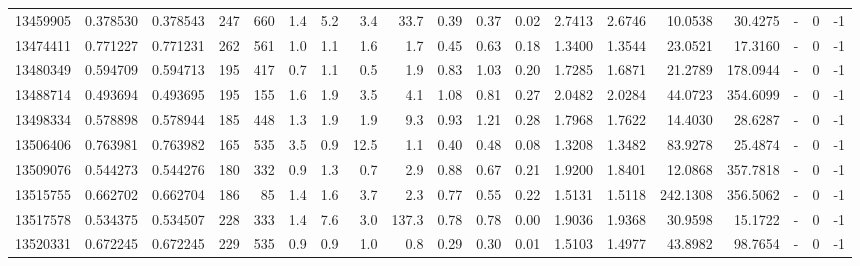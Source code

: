 \begin{tabular}{rrrrrrrrrrrrrrrrlrr}
  13459905 & 0.378530 &   0.378543 &  247 &  660 &      1.4 &      5.2 &     3.4 &     33.7 &       0.39 &        0.37 &        0.02 &  2.7413 &  2.6746 &   10.0538 &   30.4275 &             - &        0 &         -1 \\
  13474411 & 0.771227 &   0.771231 &  262 &  561 &      1.0 &      1.1 &     1.6 &      1.7 &       0.45 &        0.63 &        0.18 &  1.3400 &  1.3544 &   23.0521 &   17.3160 &             - &        0 &         -1 \\
  13480349 & 0.594709 &   0.594713 &  195 &  417 &      0.7 &      1.1 &     0.5 &      1.9 &       0.83 &        1.03 &        0.20 &  1.7285 &  1.6871 &   21.2789 &  178.0944 &             - &        0 &         -1 \\
  13488714 & 0.493694 &   0.493695 &  195 &  155 &      1.6 &      1.9 &     3.5 &      4.1 &       1.08 &        0.81 &        0.27 &  2.0482 &  2.0284 &   44.0723 &  354.6099 &             - &        0 &         -1 \\
  13498334 & 0.578898 &   0.578944 &  185 &  448 &      1.3 &      1.9 &     1.9 &      9.3 &       0.93 &        1.21 &        0.28 &  1.7968 &  1.7622 &   14.4030 &   28.6287 &             - &        0 &         -1 \\
  13506406 & 0.763981 &   0.763982 &  165 &  535 &      3.5 &      0.9 &    12.5 &      1.1 &       0.40 &        0.48 &        0.08 &  1.3208 &  1.3482 &   83.9278 &   25.4874 &             - &        0 &         -1 \\
  13509076 & 0.544273 &   0.544276 &  180 &  332 &      0.9 &      1.3 &     0.7 &      2.9 &       0.88 &        0.67 &        0.21 &  1.9200 &  1.8401 &   12.0868 &  357.7818 &             - &        0 &         -1 \\
  13515755 & 0.662702 &   0.662704 &  186 &   85 &      1.4 &      1.6 &     3.7 &      2.3 &       0.77 &        0.55 &        0.22 &  1.5131 &  1.5118 &  242.1308 &  356.5062 &             - &        0 &         -1 \\
  13517578 & 0.534375 &   0.534507 &  228 &  333 &      1.4 &      7.6 &     3.0 &    137.3 &       0.78 &        0.78 &        0.00 &  1.9036 &  1.9368 &   30.9598 &   15.1722 &             - &        0 &         -1 \\
  13520331 & 0.672245 &   0.672245 &  229 &  535 &      0.9 &      0.9 &     1.0 &      0.8 &       0.29 &        0.30 &        0.01 &  1.5103 &  1.4977 &   43.8982 &   98.7654 &             - &        0 &         -1 \\

\end{tabular}
